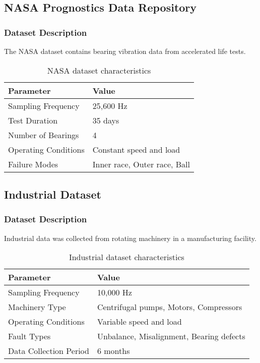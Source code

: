 \subsection{NASA Prognostics Data Repository}

\subsubsection{Dataset Description}

The NASA dataset contains bearing vibration data from accelerated life tests.

\begin{table}[H]
\centering
\caption{NASA dataset characteristics}
\label{tab:nasa_dataset}
\begin{tabular}{@{}ll@{}}
\toprule
Parameter & Value \\
\midrule
Sampling Frequency & 25,600 Hz \\
Test Duration & 35 days \\
Number of Bearings & 4 \\
Operating Conditions & Constant speed and load \\
Failure Modes & Inner race, Outer race, Ball \\
\bottomrule
\end{tabular}
\end{table}

\subsection{Industrial Dataset}

\subsubsection{Dataset Description}

Industrial data was collected from rotating machinery in a manufacturing facility.

\begin{table}[H]
\centering
\caption{Industrial dataset characteristics}
\label{tab:industrial_dataset}
\begin{tabular}{@{}ll@{}}
\toprule
Parameter & Value \\
\midrule
Sampling Frequency & 10,000 Hz \\
Machinery Type & Centrifugal pumps, Motors, Compressors \\
Operating Conditions & Variable speed and load \\
Fault Types & Unbalance, Misalignment, Bearing defects \\
Data Collection Period & 6 months \\
\bottomrule
\end{tabular}
\end{table}

